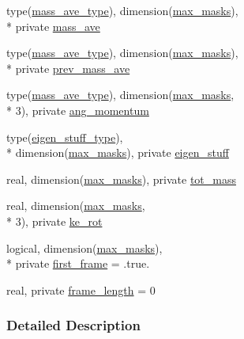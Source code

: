 \begin{DoxyCompactItemize}
type(\hyperlink{structcalc__com__ke_1_1mass__ave__type}{mass\-\_\-ave\-\_\-type}), dimension(\hyperlink{classcalc__com__ke_aa0ccd626cbe2c83360fc3f3f322a49e3}{max\-\_\-masks}), \\*
private \hyperlink{classcalc__com__ke_a3f05fe3d94a0af06d38aa7d063ccacc4}{mass\-\_\-ave}
\item 
type(\hyperlink{structcalc__com__ke_1_1mass__ave__type}{mass\-\_\-ave\-\_\-type}), dimension(\hyperlink{classcalc__com__ke_aa0ccd626cbe2c83360fc3f3f322a49e3}{max\-\_\-masks}), \\*
private \hyperlink{classcalc__com__ke_acfb72c0740a9626bae7bd565ff0a9844}{prev\-\_\-mass\-\_\-ave}
\item 
type(\hyperlink{structcalc__com__ke_1_1mass__ave__type}{mass\-\_\-ave\-\_\-type}), dimension(\hyperlink{classcalc__com__ke_aa0ccd626cbe2c83360fc3f3f322a49e3}{max\-\_\-masks}, \\*
3), private \hyperlink{classcalc__com__ke_a64928951c01426eecbeff5f6310dbab9}{ang\-\_\-momentum}
\item 
type(\hyperlink{structcalc__com__ke_1_1eigen__stuff__type}{eigen\-\_\-stuff\-\_\-type}), \\*
dimension(\hyperlink{classcalc__com__ke_aa0ccd626cbe2c83360fc3f3f322a49e3}{max\-\_\-masks}), private \hyperlink{classcalc__com__ke_a5cfdb84100f1ab18b77834edb7640dfd}{eigen\-\_\-stuff}
\item 
real, dimension(\hyperlink{classcalc__com__ke_aa0ccd626cbe2c83360fc3f3f322a49e3}{max\-\_\-masks}), private \hyperlink{classcalc__com__ke_a267edd7154fc7328559b2166aaa09a6f}{tot\-\_\-mass}
\item 
real, dimension(\hyperlink{classcalc__com__ke_aa0ccd626cbe2c83360fc3f3f322a49e3}{max\-\_\-masks}, \\*
3), private \hyperlink{classcalc__com__ke_ab6b98a0e1a1174c347a566ee87d6968f}{ke\-\_\-rot}
\item 
logical, dimension(\hyperlink{classcalc__com__ke_aa0ccd626cbe2c83360fc3f3f322a49e3}{max\-\_\-masks}), \\*
private \hyperlink{classcalc__com__ke_aaa14f98bd5343cc4fbdb740b7a6936b2}{first\-\_\-frame} = .true.
\item 
real, private \hyperlink{classcalc__com__ke_a2d596d2857cde02b13a7f4626d66c877}{frame\-\_\-length} = 0
\end{DoxyCompactItemize}


\subsubsection{Detailed Description}


